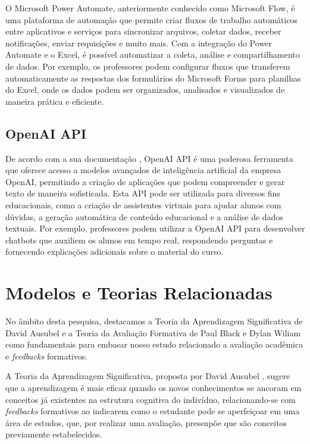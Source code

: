 O Microsoft Power Automate, anteriormente conhecido como Microsoft Flow, é uma plataforma de automação que permite criar fluxos de trabalho automáticos entre aplicativos e serviços para sincronizar arquivos, coletar dados, receber notificações, enviar requisições e muito mais. Com a integração do Power Automate e o Excel, é possível automatizar a coleta, análise e compartilhamento de dados. Por exemplo, os professores podem configurar fluxos que transferem automaticamente as respostas dos formulários do Microsoft Forms para planilhas do Excel, onde os dados podem ser organizados, analisados e visualizados de maneira prática e eficiente.

\subsection{OpenAI API}

De acordo com a sua documentação \cite{openai2024}, OpenAI API é uma poderosa ferramenta que oferece acesso a modelos avançados de inteligência artificial da empresa OpenAI, permitindo a criação de aplicações que podem compreender e gerar texto de maneira sofisticada. Esta API pode ser utilizada para diversos fins educacionais, como a criação de assistentes virtuais para ajudar alunos com dúvidas, a geração automática de conteúdo educacional e a análise de dados textuais. Por exemplo, professores podem utilizar a OpenAI API para desenvolver chatbots que auxiliem os alunos em tempo real, respondendo perguntas e fornecendo explicações adicionais sobre o material do curso.

\section{Modelos e Teorias Relacionadas}

No âmbito desta pesquisa, destacamos a Teoria da Aprendizagem Significativa de David Ausubel \cite{teorias} e a Teoria da Avaliação Formativa de Paul Black e Dylan Wiliam \cite{domingos2006} como fundamentais para embasar nosso estudo relacionado a avaliação acadêmica e \textit{feedbacks} formativos.

A Teoria da Aprendizagem Significativa, proposta por David Ausubel \cite{teorias}, sugere que a aprendizagem é mais eficaz quando os novos conhecimentos se ancoram em conceitos já existentes na estrutura cognitiva do indivíduo, relacionando-se com \textit{feedbacks} formativos ao indicarem como o estudante pode se aperfeiçoar em uma área de estudos, que, por realizar uma avaliação, pressupõe que são conceitos previamente estabelecidos.

